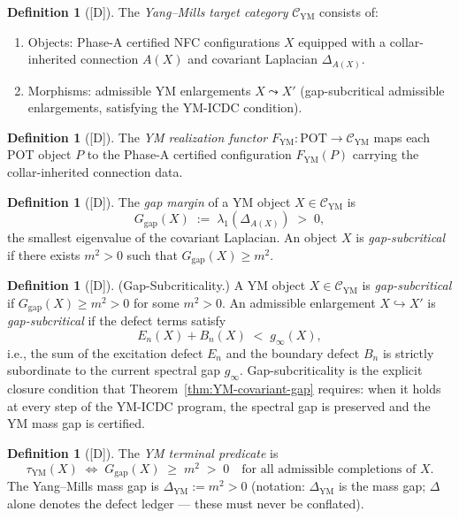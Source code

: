 \documentclass[12pt,oneside]{amsbook}
\theoremstyle{plain}
\theoremstyle{definition}
\newtheorem{definition}[theorem]{Definition}
\theoremstyle{remark}
\newcommand{\status}[1]{\textup{[#1]}}
\begin{document}
\begin{definition}[\status{D}]\label{def:YM-target-cat}
The \emph{Yang--Mills target category} $\mathcal{C}_{\mathrm{YM}}$
consists of:
\begin{enumerate}[label=\textup{(\arabic*)}]
 \item Objects: Phase-A certified NFC configurations $X$ equipped
 with a collar-inherited connection $A(X)$ and covariant
 Laplacian $\Delta_{A(X)}$.
 \item Morphisms: admissible YM enlargements $X \leadsto X'$
 (gap-subcritical admissible enlargements, satisfying the
 YM-ICDC condition).
\end{enumerate}
\end{definition}

\begin{definition}[\status{D}]\label{def:YM-functor}
The \emph{YM realization functor}
$F_{\mathrm{YM}} : \mathrm{POT} \to \mathcal{C}_{\mathrm{YM}}$
maps each POT object $P$ to the Phase-A certified configuration
$F_{\mathrm{YM}}(P)$ carrying the collar-inherited connection data.
\end{definition}

\begin{definition}[\status{D}]\label{def:gap-margin}
\label{sec:gap-margin}
The \emph{gap margin} of a YM object $X \in \mathcal{C}_{\mathrm{YM}}$
is
\[
 G_{\mathrm{gap}}(X) \;:=\; \lambda_1(\Delta_{A(X)}) \;>\; 0,
\]
the smallest eigenvalue of the covariant Laplacian. An object $X$
is \emph{gap-subcritical} if there exists $m^2 > 0$ such that
$G_{\mathrm{gap}}(X) \geq m^2$.
\end{definition}

\begin{definition}[\status{D}]\label{def:YM-gap-subcritical}
\textup{(Gap-Subcriticality.)}
A YM object $X \in \mathcal{C}_{\mathrm{YM}}$ is \emph{gap-subcritical}
if $G_{\mathrm{gap}}(X) \geq m^2 > 0$ for some $m^2 > 0$. An
admissible enlargement $X \hookrightarrow X'$ is \emph{gap-subcritical}
if the defect terms satisfy
\[
 E_n(X) + B_n(X) \;<\; g_\infty(X),
\]
i.e., the sum of the excitation defect $E_n$ and the boundary defect
$B_n$ is strictly subordinate to the current spectral gap
$g_\infty$. Gap-subcriticality is the explicit closure condition that
Theorem~\ref{thm:YM-covariant-gap} requires: when it holds at every
step of the YM-ICDC program, the spectral gap is preserved and the
YM mass gap is certified.
\end{definition}

\begin{definition}[\status{D}]\label{def:YM-terminal-predicate}
The \emph{YM terminal predicate} is
\[
 \tau_{\mathrm{YM}}(X)
 \;\iff\;
 G_{\mathrm{gap}}(X) \;\geq\; m^2 \;>\; 0
 \quad\text{for all admissible completions of } X.
\]
The Yang--Mills mass gap is $\Delta_{\mathrm{YM}} := m^2 > 0$
(notation: $\Delta_{\mathrm{YM}}$ is the mass gap; $\Delta$ alone
denotes the defect ledger --- these must never be conflated).
\end{definition}
\end{document}
